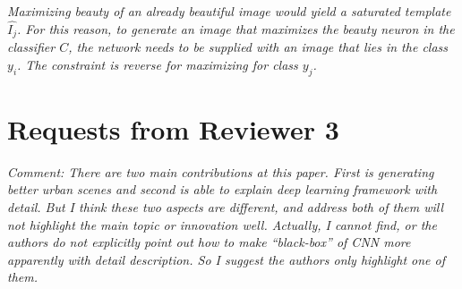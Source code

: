 \documentclass{paper}
\newenvironment{myquote}
{\definecolor{shadecolor}{rgb}{0.9,0.95,1} \begin{shaded*} \sf \em}
{\em\end{shaded*}}
\newenvironment{myquoteOrange}
{\definecolor{shadecolor}{rgb}{1,0.9,0.83} \begin{shaded*} \sf \em}
{\em\end{shaded*}}
\begin{document}
\begin{myquoteOrange}
Maximizing beauty of an already beautiful image would yield a saturated template $\hat{I_j}$. For this reason, to generate an image that maximizes the beauty neuron in the classifier $C$, the network needs to be supplied with an image that lies in the class $y_i$. The constraint is reverse for maximizing for class $y_j$.
\end{myquoteOrange}


\section*{Requests from Reviewer 3}

\begin{myquote}
\noindent Comment: There are two main contributions at this paper. First is generating better urban scenes and second is able to explain deep learning framework with detail. But I think these two aspects are different, and address both of them will not highlight the main topic or innovation well. Actually, I cannot find, or the authors do not explicitly point out how to make ``black-box'' of CNN more apparently with detail description. So I suggest the authors only highlight one of them.
\end{myquote}
\end{document}
